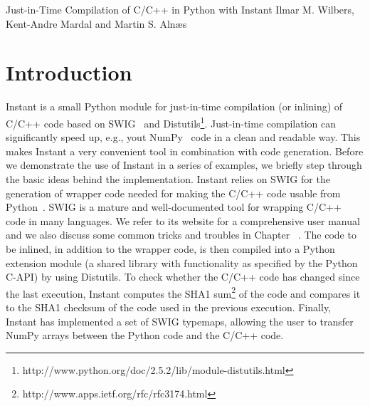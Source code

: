



{Just-in-Time Compilation of C/C++ in Python with Instant}
{Ilmar M. Wilbers, Kent-Andre Mardal and Martin S. Aln{\ae}s}

%




\section{Introduction}
Instant is a small Python module for just-in-time compilation (or inlining) of
C/C++ code based on SWIG~\cite{SWIG} and
Distutils\footnote{http://www.python.org/doc/2.5.2/lib/module-distutils.html}. 
Just-in-time compilation can significantly speed up, e.g., yout NumPy~\cite{NumPy} code in a clean and
readable way. This makes Instant a very convenient tool in combination with code
generation. Before we demonstrate the use of Instant in a series of examples,
we briefly step through the basic ideas behind the implementation.
Instant relies on SWIG for the generation of wrapper code needed for making the
C/C++ code usable from Python~\cite{Python}. SWIG is a mature and well-documented tool
for wrapping C/C++ code in many languages. We refer to its website for a comprehensive 
user manual and we also discuss some common tricks and troubles in Chapter ~\cite{mixedlanguage}. 
The code to be inlined, in addition to the
wrapper code, is then compiled into a Python extension module (a shared library
with functionality as specified by the Python C-API) by using
Distutils. To check whether the C/C++ code has changed since the last
execution, Instant computes the SHA1
sum\footnote{http://www.apps.ietf.org/rfc/rfc3174.html} of the code and compares it to
the SHA1 checksum of the code used in the previous execution. Finally, Instant has
implemented a set of SWIG typemaps, allowing the user to
transfer NumPy arrays between the Python code and the C/C++ code.

